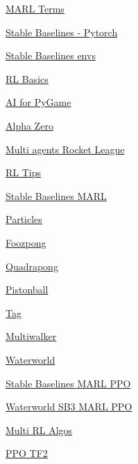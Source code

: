 \vs
\href{https://rlss.inria.fr/files/2019/07/RLSS_Multiagent.pdf}{MARL Terms}

\vs
\href{https://github.com/DLR-RM/stable-baselines3}{Stable Baselines - Pytorch}

\vs
\href{https://github.com/DLR-RM/rl-baselines3-zoo}{Stable Baselines envs}

\vs
\href{https://karpathy.github.io/2016/05/31/rl/}{RL Basics}

\vs
\href{https://towardsdatascience.com/ultimate-guide-for-reinforced-learning-part-1-creating-a-game-956f1f2b0a91}{AI for PyGame}

\vs
\href{https://web.stanford.edu/~surag/posts/alphazero.html}{Alpha Zero}

\vs
\href{https://github.com/lucas-emery/rocket-league-gym}{Multi agents Rocket League}

\vs
\href{https://stable-baselines.readthedocs.io/en/master/guide/rl_tips.html}{RL Tips}

\vs
\href{https://stable-baselines3.readthedocs.io/en/master/search.html?q=multi+agent&check_keywords=yes&area=default#}{Stable Baselines MARL}

\vs
\href{https://pettingzoo.farama.org/environments/mpe/}{Particles}

\vs
\href{https://pettingzoo.farama.org/environments/atari/foozpong/}{Foozpong}

\vs
\href{https://pettingzoo.farama.org/environments/atari/quadrapong/}{Quadrapong}

\vs
\href{https://pettingzoo.farama.org/environments/butterfly/pistonball/}{Pistonball}

\vs
\href{https://pettingzoo.farama.org/environments/mpe/simple_tag/}{Tag}

\vs
\href{https://pettingzoo.farama.org/environments/sisl/multiwalker/}{Multiwalker}

\vs
\href{https://pettingzoo.farama.org/environments/sisl/waterworld/}{Waterworld}

\vs
\href{https://pettingzoo.farama.org/tutorials/sb3/kaz/}{Stable Baselines MARL PPO}

\vs
\href{https://pettingzoo.farama.org/tutorials/sb3/waterworld/}{Waterworld SB3 MARL PPO}

\vs
\href{https://docs.ray.io/en/latest/rllib/rllib-algorithms.html}{Multi RL Algos}

\vs
\href{https://github.com/philtabor/Youtube-Code-Repository/tree/master/ReinforcementLearning/PolicyGradient/PPO/tf2}{PPO TF2}

